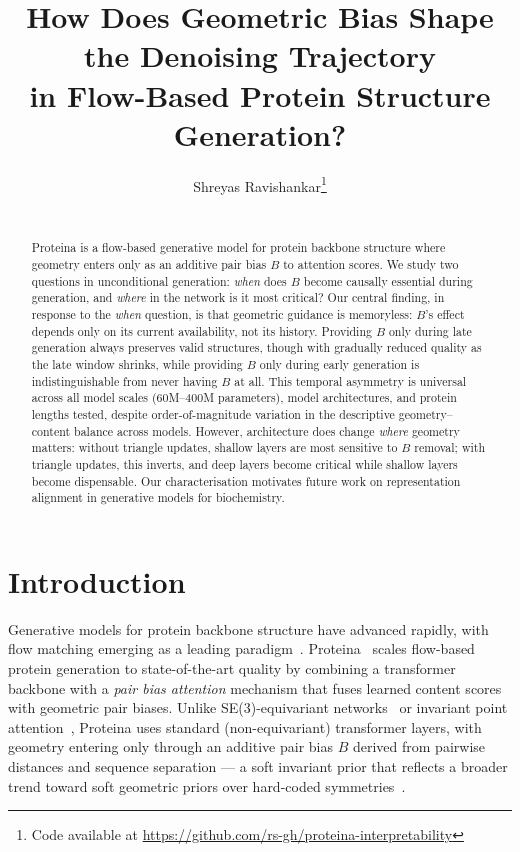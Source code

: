 \documentclass{article}
\title[Geometric Bias in Flow-Based Protein Structure Generation]{How Does Geometric Bias Shape the Denoising Trajectory\\
in Flow-Based Protein Structure Generation?}
\author[S. Ravishankar]{Shreyas Ravishankar\thanks{Code available at \url{https://github.com/rs-gh/proteina-interpretability}}\\
\institute{University of Cambridge}\\
\email{sr2173@cam.ac.uk}}
\begin{document}
\maketitle

\begin{abstract}
Proteina is a flow-based generative model for protein backbone structure where geometry enters only as an additive pair bias $B$ to attention scores.
We study two questions in unconditional generation: \emph{when} does $B$ become causally essential during generation, and \emph{where} in the network is it most critical?
Our central finding, in response to the \emph{when} question, is that geometric guidance is memoryless: $B$'s effect depends only on its current availability, not its history. Providing $B$ only during late generation always preserves valid structures, though with gradually reduced quality as the late window shrinks, while providing $B$ only during early generation is indistinguishable from never having $B$ at all.
This temporal asymmetry is universal across all model scales (60M--400M parameters), model architectures, and protein lengths tested, despite order-of-magnitude variation in the descriptive geometry--content balance across models.
However, architecture does change \emph{where} geometry matters: without triangle updates, shallow layers are most sensitive to $B$ removal; with triangle updates, this inverts, and deep layers become critical while shallow layers become dispensable.
Our characterisation motivates future work on representation alignment in generative models for biochemistry.
\end{abstract}

\section{Introduction}

Generative models for protein backbone structure have advanced rapidly, with flow matching emerging as a leading paradigm~\citep{lipman2023flow}.
Proteina~\citep{geffner2025proteina} scales flow-based protein generation to state-of-the-art quality by combining a transformer backbone with a \emph{pair bias attention} mechanism that fuses learned content scores with geometric pair biases.
Unlike SE(3)-equivariant networks~\citep{thomas2018tensor,fuchs2020se3} or invariant point attention~\citep{jumper2021alphafold2}, Proteina uses standard (non-equivariant) transformer layers, with geometry entering only through an additive pair bias $B$ derived from pairwise distances and sequence separation --- a soft invariant prior that reflects a broader trend toward soft geometric priors over hard-coded symmetries~\citep{dosovitskiy2021image,kim2022tokengt,abramson2024alphafold3}.
\end{document}
